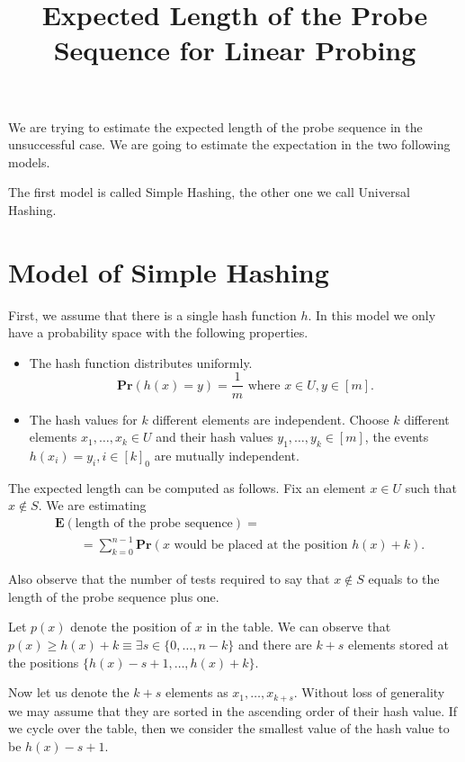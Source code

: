 \documentclass[12pt,notitlepage]{report}
\title{Expected Length of the Probe Sequence for Linear Probing}
\theoremstyle{definition}
\theoremstyle{plain}
\newcommand{\Prob}[1]{\mathbf{Pr}\left(#1\right)}
\newcommand{\Expect}[1]{\mathbf{E}\left(#1\right)}
\begin{document}
\maketitle

We are trying to estimate the expected length of the probe sequence in the unsuccessful case.
We are going to estimate the expectation in the two following models.

The first model is called Simple Hashing, the other one we call Universal Hashing.

\section{Model of Simple Hashing}

First, we assume that there is a single hash function $h$. In this model we only have a probability space with the following properties.

\begin{itemize}
\item The hash function distributes uniformly.
\[
	\Prob{h(x) = y} = \frac{1}{m} \mbox{ where } x \in U, y \in [m].
\] 

\item The hash values for $k$ different elements are independent. Choose $k$ different elements $x_1, \dots, x_k \in  U$ and their hash values $y_1, \dots, y_k \in [m]$, the events $h(x_i) = y_i, i \in [k]_0$ are mutually independent.
\end{itemize}

The expected length can be computed as follows. Fix an element $x \in U$ such that $x \not \in S$. We are estimating
\[
\begin{split}
& \Expect{\mbox{length of the probe sequence}} = \\
	& \qquad = \sum_{k = 0}^{n - 1} \Prob{x\mbox{ would be placed at the position }h(x) + k}.
\end{split}
\]

Also observe that the number of tests required to say that $x \not \in S$ equals to the length of the probe sequence plus one.

Let $p(x)$ denote the position of $x$ in the table. We can observe that $p(x) \geq h(x) + k \equiv \exists s \in \{0, \dots, n - k\}$ and there are $k + s$  elements stored at the positions $\{h(x) - s + 1, \dots, h(x) + k\}.$

Now let us denote the $k + s$ elements as $x_1, \dots, x_{k + s}$. Without loss of generality we may assume that they are sorted in the ascending order of their hash value. If we cycle over the table, then we consider the smallest value of the hash value to be $h(x) - s + 1$. 
\end{document}
